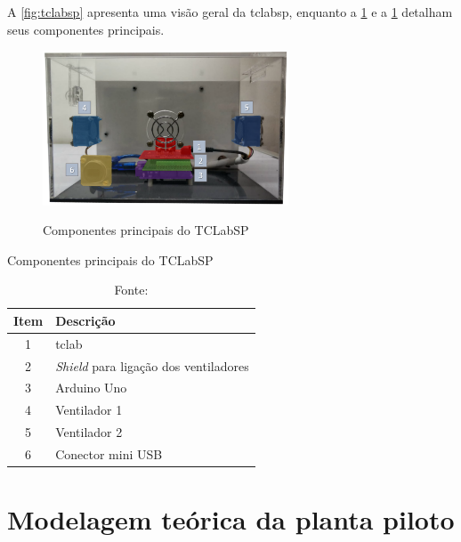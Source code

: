 A \cref{fig:tclabsp} apresenta uma visão geral da \acrshort{tclabsp}, enquanto a \cref{fig:tclabsp_color}
e a \cref{tab:componentes_tclabsp} detalham seus componentes principais.

\begin{figure}[h]
	\caption{Componentes principais do TCLabSP}
	\begin{center}
		\includegraphics[width=0.65\textwidth]{./5_images/TCLabSP_color_numbers.png} 
		\label{fig:tclabsp_color}
	\end{center}
	\centering
\end{figure}

\begin{table}[!h]
	\centering
	\caption{Componentes principais do TCLabSP}
	\label{tab:componentes_tclabsp}
	\begin{tabular}{cl} \toprule
		{Item}			& {Descrição} 										\\ \midrule
		1		 		& \acrshort{tclab}	 								\\
		2				& \textit{Shield} para ligação dos ventiladores		\\
		3				& Arduino Uno										\\
		4				& Ventilador 1										\\
		5				& Ventilador 2										\\
		6				& Conector mini USB									\\ \bottomrule
	\end{tabular}
	\caption*{Fonte: }
\end{table}

\section{Modelagem teórica da planta piloto}
\label{sec:modelagem_da_planta_piloto}

